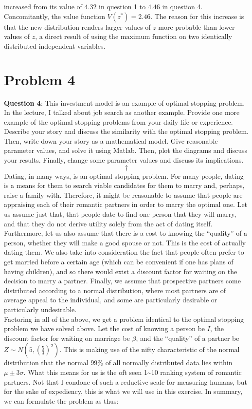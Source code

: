 \documentclass[
]{article}
\begin{document}
increased from its value of \(4.32\) in question 1 to \(4.46\) in
question 4. Concomitantly, the value function \(V(z^*)=2.46\). The
reason for this increase is that the new distribution renders larger
values of \(z\) more probable than lower values of \(z\), a direct
result of using the maximum function on two identically distributed
independent variables.

\hypertarget{problem-4}{%
\section{Problem 4}\label{problem-4}}

\textbf{Question 4}: This investment model is an example of optimal
stopping problem. In the lecture, I talked about job search as another
example. Provide one more example of the optimal stopping problems from
your daily life or experience. Describe your story and discuss the
similarity with the optimal stopping problem. Then, write down your
story as a mathematical model. Give reasonable parameter values, and
solve it using Matlab. Then, plot the diagrams and discuss your results.
Finally, change some parameter values and discuss its implications.
\[\dagger\] Dating, in many ways, is an optimal stopping problem. For
many people, dating is a means for them to search viable candidates for
them to marry and, perhaps, raise a family with. Therefore, it might be
reasonable to assume that people are appraising each of their romantic
partners in order to marry the optimal one. Let us assume just that,
that people date to find one person that they will marry, and that they
do not derive utility solely from the act of dating itself. Furthermore,
let us also assume that there is a cost to knowing the ``quality'' of a
person, whether they will make a good spouse or not. This is the cost of
actually dating them. We also take into consideration the fact that
people often prefer to get married before a certain age (which can be
convenient if one has plans of having children), and so there would
exist a discount factor for waiting on the decision to marry a partner.
Finally, we assume that prospective partners come distributed according
to a normal distribution, where most partners are of average appeal to
the individual, and some are particularly desirable or particularly
undesirable.\\
Factoring in all of the above, we get a problem identical to the optimal
stopping problem we have solved above. Let the cost of knowing a person
be \(I\), the discount factor for waiting on marriage be \(\beta\), and
the ``quality'' of a partner be
\(Z \sim N\left(5, (\frac{5}{3})^2\right)\). This is making use of the
nifty characteristic of the normal distribution that the normal 99\% of
all normally distributed data lies within \(\mu \pm 3\sigma\). What this
means for us is the oft seen 1\textasciitilde10 ranking system of
romantic partners. Not that I condone of such a reductive scale for
measuring humans, but for the sake of expediency, this is what we will
use in this exercise. In summary, we can formulate the problem as thus:
\end{document}

